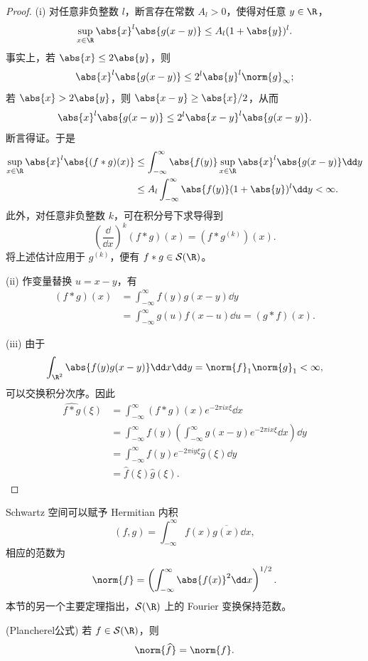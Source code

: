 \begin{proof}
	(i) 对任意非负整数 $l$，断言存在常数 $A_l>0$，使得对任意 $y\in\R$，
	\[
	\sup_{x\in\R}\abs{x}^l\abs{g(x-y)}
	\leq A_l(1+\abs{y})^l.
	\]
	事实上，若 $\abs{x}\leq2\abs{y}$，则
	\[
	\abs{x}^l\abs{g(x-y)}
	\leq2^l\abs{y}^l\norm{g}_\infty;
	\]
	若 $\abs{x}>2\abs{y}$，则 $\abs{x-y}\geq\abs{x}/2$，从而
	\[
	\abs{x}^l\abs{g(x-y)}
	\leq2^l\abs{x-y}^l\abs{g(x-y)}.
	\]
	断言得证。于是
	\[
	\begin{aligned}
		\sup_{x\in\R}\abs{x}^l\abs{(f*g)(x)}
		&\leq\int_{-\infty}^{\infty}\abs{f(y)}
		\sup_{x\in\R}\abs{x}^l\abs{g(x-y)}\dd y\\
		&\leq A_l\int_{-\infty}^{\infty}
		\abs{f(y)}(1+\abs{y})^l\dd y<\infty.
	\end{aligned}
	\]
	此外，对任意非负整数 $k$，可在积分号下求导得到
	\[
	\left(\frac{\dd}{\dd x}\right)^k(f*g)(x)
	=(f*g^{(k)})(x).
	\]
	将上述估计应用于 $g^{(k)}$，便有 $f*g\in\mathcal S(\R)$。
	
	(ii) 作变量替换 $u=x-y$，有
	\[
	\begin{aligned}
		(f*g)(x)
		&=\int_{-\infty}^{\infty}f(y)g(x-y)\dd y\\
		&=\int_{-\infty}^{\infty}g(u)f(x-u)\dd u
		=(g*f)(x).
	\end{aligned}
	\]
	
	(iii) 由于
	\[
	\int_{\R^2}\abs{f(y)g(x-y)}\dd x\dd y
	=\norm{f}_1\norm{g}_1<\infty,
	\]
	可以交换积分次序。因此
	\[
	\begin{aligned}
		\widehat{f*g}(\xi)
		&=\int_{-\infty}^{\infty}(f*g)(x)e^{-2\pi ix\xi}\dd x\\
		&=\int_{-\infty}^{\infty}f(y)
		\left(\int_{-\infty}^{\infty}g(x-y)e^{-2\pi ix\xi}\dd x\right)\dd y\\
		&=\int_{-\infty}^{\infty}f(y)e^{-2\pi iy\xi}\widehat g(\xi)\dd y\\
		&=\widehat f(\xi)\widehat g(\xi).
	\end{aligned}
	\]
\end{proof}

Schwartz 空间可以赋予 Hermitian 内积
\[
(f,g)=\int_{-\infty}^{\infty}f(x)\overline{g(x)}\dd x,
\]
相应的范数为
\[
\norm{f}
=\left(\int_{-\infty}^{\infty}\abs{f(x)}^2\dd x\right)^{1/2}.
\]
本节的另一个主要定理指出，$\mathcal S(\R)$ 上的 Fourier 变换保持范数。
\newpage
\begin{theorem}[Plancherel]\label{thm:plancherel-schwartz}(Plancherel公式)
	若 $f\in\mathcal S(\R)$，则
	\[
	\norm{\widehat f}=\norm{f}.
	\]
\end{theorem}

